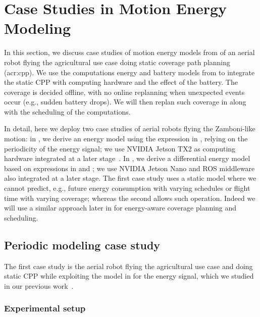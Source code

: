 \section{Case Studies in Motion Energy Modeling}
\label{sec:res-ene-mot}

In this section, we discuss case studies of motion energy models from  of an aerial robot flying the agricultural use case doing static coverage path planning (\Gls{acr:cpp}). We use the computations energy and battery models from  to integrate the static CPP with computing hardware and the effect of the battery. The coverage is decided offline, with no online replanning when unexpected events occur (e.g., sudden battery drops). We will then replan such coverage in  along with the scheduling of the computations. 

In detail, here we deploy two case studies of aerial robots flying the Zamboni-like motion: in , we derive an energy model using the expression in , relying on the periodicity of the energy signal; we use NVIDIA Jetson TX2 as computing hardware integrated at a later stage~\citep{seewald2020mechanical}. In , we derive a differential energy model based on expressions in  and ; we use NVIDIA Jetson Nano and ROS middleware also integrated at a later stage. The first case study uses a static model where we cannot predict, e.g., future energy consumption with varying schedules or flight time with varying coverage; whereas the second allows such operation. Indeed we will use a similar approach later in  for energy-aware coverage planning and scheduling.

\subsection{Periodic modeling case study}
\label{sec:res-perio}

The first case study is the aerial robot flying the agricultural use case and doing static CPP while exploiting the model in  for the energy signal, which we studied in our previous work~\citep{seewald2020mechanical}. 

\subsubsection*{Experimental setup}

